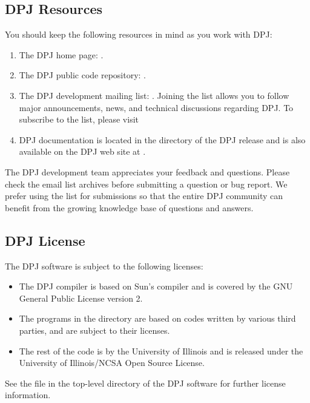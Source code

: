  \subsection{DPJ Resources%
\label{sec:getDPJ}}
You should keep the following resources in mind as you work with DPJ:
\begin{enumerate}
\item The DPJ home page: .
\item The DPJ public code repository:
  .
\item The DPJ development mailing list: .
  Joining the list allows you to follow major announcements, news, and
  technical discussions regarding DPJ.  To subscribe to the list,
  please visit
%

\item DPJ documentation is located in the 
  directory of the DPJ release and is also available on the DPJ web
  site at .
\end{enumerate}

The DPJ development team appreciates your feedback and questions.
Please check the email list archives before submitting a question or
bug report.  We prefer using the list for submissions so that the
entire DPJ community can benefit from the growing knowledge base of
questions and answers.


\subsection{DPJ License}

The DPJ software is subject to the following licenses:
%
\begin{itemize}
%
\item The DPJ compiler is based on Sun's  compiler and is
  covered by the GNU General Public License version 2.
%
\item The programs in the  directory are
  based on codes written by various third parties, and are subject to
  their licenses.
%
\item The rest of the code is by the University of Illinois and is
  released under the University of Illinois/NCSA Open Source License.
%
\end{itemize}
%
See the file  in the top-level directory of the DPJ
software for further license information.


